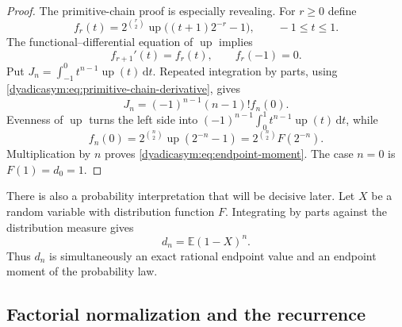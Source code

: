 \documentclass[11pt,oneside]{article}
\theoremstyle{definition}
\theoremstyle{remark}
\newcommand{\Up}{\operatorname{up}}
\newcommand{\dd}{\,\mathrm d}
\newcommand{\E}{\mathbb E}
\begin{document}
\begin{proof}
The primitive-chain proof is especially revealing.  For $r\ge0$ define
\begin{equation}
 f_r(t)=2^{\binom r2}\Up\bigl((t+1)2^{-r}-1\bigr),
 \qquad -1\le t\le1.                                       \label{dyadicasym:eq:primitive-chain}
\end{equation}
The functional--differential equation of $\Up$ implies
\begin{equation}
 f_{r+1}'(t)=f_r(t),\qquad f_r(-1)=0.                        \label{dyadicasym:eq:primitive-chain-derivative}
\end{equation}
Put $J_n=\int_{-1}^0t^{n-1}\Up(t)\dd t$.  Repeated integration by parts, using
\eqref{dyadicasym:eq:primitive-chain-derivative}, gives
\begin{equation}
 J_n=(-1)^{n-1}(n-1)!f_n(0).                                \label{dyadicasym:eq:J-chain}
\end{equation}
Evenness of $\Up$ turns the left side into
$(-1)^{n-1}\int_0^1t^{n-1}\Up(t)\dd t$, while
\begin{equation*}
 f_n(0)=2^{\binom n2}\Up(2^{-n}-1)
       =2^{\binom n2}F(2^{-n}).
\end{equation*}
Multiplication by $n$ proves \eqref{dyadicasym:eq:endpoint-moment}.  The case $n=0$ is
$F(1)=d_0=1$.
\end{proof}

There is also a probability interpretation that will be decisive later.  Let $X$ be a random
variable with distribution function $F$.  Integrating by parts against the distribution
measure gives
\begin{equation}
 d_n=\E(1-X)^n.                                              \label{dyadicasym:eq:dn-endpoint-probability}
\end{equation}
Thus $d_n$ is simultaneously an exact rational endpoint value and an endpoint moment of the
probability law.

\subsection{Factorial normalization and the recurrence}
\end{document}
